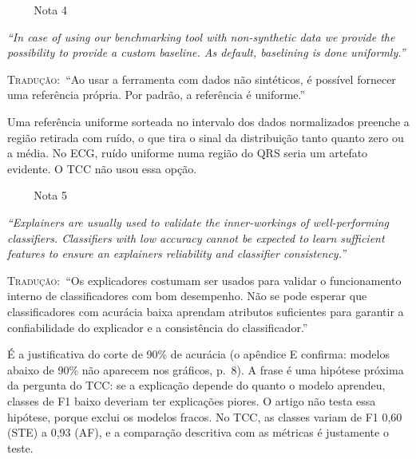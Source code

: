 \documentclass[11pt,a4paper]{article}
\newcommand{\pagechip}[1]{{\setlength{\fboxsep}{1.5pt}\colorbox{cAcc}{\textcolor{white}{\scriptsize\texttt{#1}}}}}
\newenvironment{origquote}{\par\itshape\small}{\par}
\newenvironment{tradquote}{\par\small\textsc{Tradução:}\ }{\par}
\newcommand{\explab}[1]{\par\smallskip{\small\color{cAcc}\textbf{\MakeUppercase{#1}}}\par}
\begin{document}
\begin{citacard}{\pagechip{p. 4} Nota 4}
\begin{origquote}“In case of using our benchmarking tool with non-synthetic data we provide the possibility to provide a custom baseline. As default, baselining is done uniformly.”\end{origquote}
\begin{tradquote}“Ao usar a ferramenta com dados não sintéticos, é possível fornecer uma referência própria. Por padrão, a referência é uniforme.”\end{tradquote}
\explab{Explicação}
Uma referência uniforme sorteada no intervalo dos dados normalizados preenche a região retirada com ruído, o que tira o sinal da distribuição tanto quanto zero ou a média. No ECG, ruído uniforme numa região do QRS seria um artefato evidente. O TCC não usou essa opção.
\end{citacard}

\begin{citacard}{\pagechip{p. 4} Nota 5}
\begin{origquote}“Explainers are usually used to validate the inner-workings of well-performing classifiers. Classifiers with low accuracy cannot be expected to learn sufficient features to ensure an explainers reliability and classifier consistency.”\end{origquote}
\begin{tradquote}“Os explicadores costumam ser usados para validar o funcionamento interno de classificadores com bom desempenho. Não se pode esperar que classificadores com acurácia baixa aprendam atributos suficientes para garantir a confiabilidade do explicador e a consistência do classificador.”\end{tradquote}
\explab{Explicação}
É a justificativa do corte de 90\% de acurácia (o apêndice E confirma: modelos abaixo de 90\% não aparecem nos gráficos, p.~8). A frase é uma hipótese próxima da pergunta do TCC: se a explicação depende do quanto o modelo aprendeu, classes de F1 baixo deveriam ter explicações piores. O artigo não testa essa hipótese, porque exclui os modelos fracos. No TCC, as classes variam de F1 0,60 (STE) a 0,93 (AF), e a comparação descritiva com as métricas é justamente o teste.
\end{citacard}
\end{document}
